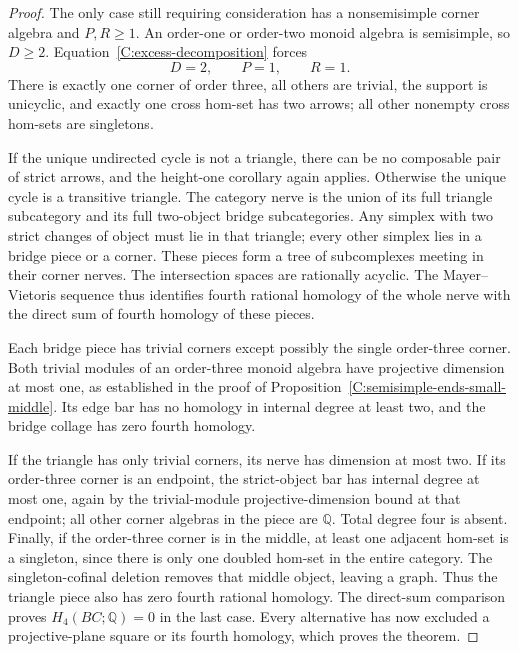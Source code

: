 \begin{proof}
The only case still requiring consideration has a
nonsemisimple corner algebra and $P,R\geq1$.
An order-one or order-two monoid algebra is semisimple,
so $D\geq2$.  Equation~\eqref{C:excess-decomposition}
forces
\[
 D=2,\qquad P=1,\qquad R=1.
\]
There is exactly one corner of order three, all others
are trivial, the support is unicyclic, and exactly one
cross hom-set has two arrows; all other nonempty cross
hom-sets are singletons.

If the unique undirected cycle is not a triangle,
there can be no composable pair of strict arrows, and
the height-one corollary again applies.  Otherwise the
unique cycle is a transitive triangle.  The category
nerve is the union of its full triangle subcategory
and its full two-object bridge subcategories.  Any
simplex with two strict changes of object must lie in
that triangle; every other simplex lies in a bridge
piece or a corner.  These pieces form a tree of
subcomplexes meeting in their corner nerves.  The
intersection spaces are rationally acyclic.  The
Mayer--Vietoris sequence thus identifies fourth rational
homology of the whole nerve with the direct sum of
fourth homology of these pieces.

Each bridge piece has trivial corners except possibly
the single order-three corner.  Both trivial modules
of an order-three monoid algebra have projective
dimension at most one, as established in the proof
of Proposition~\ref{C:semisimple-ends-small-middle}.
Its edge bar has no homology in internal degree at
least two, and the bridge collage has zero fourth
homology.

If the triangle has only trivial corners, its nerve
has dimension at most two.  If its order-three corner
is an endpoint, the strict-object bar has internal
degree at most one, again by the trivial-module
projective-dimension bound at that endpoint; all other
corner algebras in the piece are $\mathbb Q$.
Total degree four is absent.  Finally, if the
order-three corner is in the middle, at least one
adjacent hom-set is a singleton, since there is only
one doubled hom-set in the entire category.  The
singleton-cofinal deletion removes that middle
object, leaving a graph.  Thus the triangle piece
also has zero fourth rational homology.
The direct-sum comparison proves $H_4(BC;\mathbb Q)=0$
in the last case.  Every alternative has now excluded
a projective-plane square or its fourth homology,
which proves the theorem.
\end{proof}

